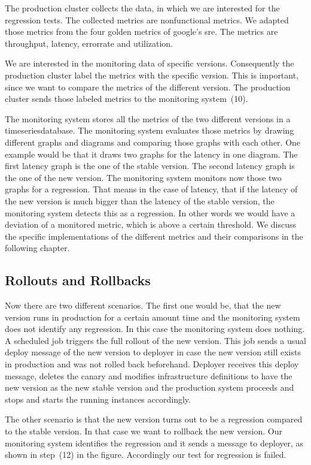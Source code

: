 The production cluster collects the data, in which we are interested for the regression
tests.  The collected metrics are nonfunctional metrics. We adapted those metrics from the
four golden metrics of google's sre. The metrics are throughput, latency, errorrate and
utilization.

We are interested in the monitoring data of specific versions. Consequently the production
cluster label the metrics with the specific version. This is important, since we want to
compare the metrics of the different version.  The production cluster sends those labeled
metrics to the monitoring system~(10).

The monitoring system stores all the metrics of the two different versions in a
timeseriesdatabase. The monitoring system evaluates those metrics by drawing different
graphs and diagrams and comparing those graphs with each other. One example would be that
it draws two graphs for the latency in one diagram. The first latency graph is the one of
the stable version. The second latency graph is the one of the new version. The monitoring
system monitors now those two graphs for a regression. That means in the case of latency,
that if the latency of the new version is much bigger than the latency of the stable
version, the monitoring system detects this as a regression. In other words we would have
a deviation of a monitored metric, which is above a certain threshold. We discuss the
specific implementations of the different metrics and their comparisons in the following
chapter.

\subsection{Rollouts and Rollbacks}

Now there are two different scenarios. The first one would be, that the new version runs
in production for a certain amount time and the monitoring system does not identify any
regression. In this case the monitoring system does nothing. A scheduled job triggers the
full rollout of the new version. This job sends a usual deploy message of the new version
to deployer in case the new version still exists in production and was not rolled back
beforehand. Deployer receives this deploy message, deletes the canary and modifies
infrastructure definitions to have the new version as the new stable version and the
production system proceeds and stops and starts the running instances accordingly.

The other scenario is that the new version turns out to be a regression compared to the
stable version. In that case we want to rollback the new version. Our monitoring system
identifies the regression and it sends a message to deployer, as shown in step~(12) in the
figure. Accordingly our test for regression is failed.

